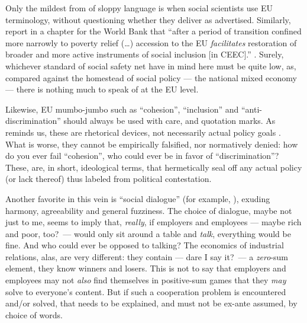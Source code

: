 Only the mildest from of sloppy language is when social scientists use \gls{EU} terminology, without questioning whether they deliver as advertised.
Similarly, \citeauthor{Sipos2005} report in a chapter for the World Bank that ``after a period of transition confined more narrowly to poverty relief (\ldots) accession to the \gls{EU} \emph{facilitates} restoration of broader and more active instruments of social inclusion [in \gls{CEEC}].'' \citeyearpar[89, emphasis added]{Sipos2005}.
Surely, whichever standard \citeauthor{Sipos2005} of social safety net have in mind here must be quite low, as, compared against the homestead of social policy --- the national mixed economy --- there is nothing much to speak of at the \gls{EU} level.

Likewise, \gls{EU} mumbo-jumbo such as ``cohesion'', ``inclusion'' and ``anti-discrimination'' should always be used with care, and quotation marks.
As \citeauthor{Offe2003} reminds us, these are rhetorical devices, not necessarily actual policy goals \citeyearpar[461]{Offe2003}.
What is worse, they cannot be empirically falsified, nor normatively denied:
how do you ever fail ``cohesion'', who could ever be in favor of ``discrimination''?
These, are, in short, ideological terms, that hermetically seal off any actual policy (or lack thereof) thus labeled from political contestation.

Another favorite in this vein is ``social dialogue'' (for example, \citealt{Durr2009}), exuding harmony, agreeability and general fuzziness.
The choice of dialogue, maybe not just to me, seems to imply that, \emph{really}, if employers and employees --- maybe rich and poor, too?\ --- would only sit around a table and \emph{talk}, everything would be fine.
And who could ever be opposed to talking?
The economics of industrial relations, alas, are very different:
they contain --- dare I say it?\ --- a \emph{zero}-sum element, they know winners and losers.
This is not to say that employers and employees may not \emph{also} find themselves in positive-sum games that they \emph{may} solve to everyone's content.
But if such a cooperation problem is encountered and/or solved, that needs to be explained, and must not be ex-ante assumed, by choice of words.

